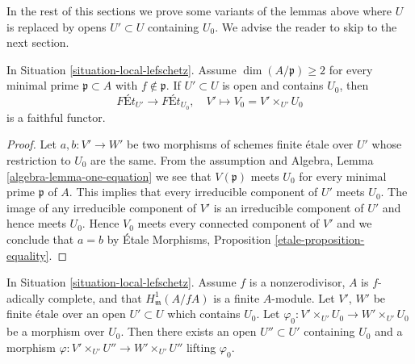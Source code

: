 \noindent
In the rest of this sections we prove some variants of the lemmas above
where $U$ is replaced by opens $U' \subset U$ containing $U_0$.
We advise the reader to skip to the next section.

\begin{lemma}
\label{lemma-faithful-general}
In Situation \ref{situation-local-lefschetz}.
Assume $\dim(A/\mathfrak p) \geq 2$ for every minimal prime
$\mathfrak p \subset A$ with $f \not \in \mathfrak p$.
If $U' \subset U$ is open and contains $U_0$, then
$$
\textit{F\'Et}_{U'} \longrightarrow \textit{F\'Et}_{U_0},\quad
V' \longmapsto V_0 = V' \times_{U'} U_0
$$
is a faithful functor.
\end{lemma}

\begin{proof}
Let $a, b : V' \to W'$ be two morphisms of schemes finite \'etale
over $U'$ whose restriction to $U_0$ are the same. From the assumption
and Algebra, Lemma \ref{algebra-lemma-one-equation}
we see that $V(\mathfrak p)$ meets $U_0$ for
every minimal prime $\mathfrak p$ of $A$. This implies that every
irreducible component of $U'$ meets $U_0$.
The image of any irreducible component of $V'$ is an
irreducible component of $U'$ and hence meets $U_0$.
Hence $V_0$ meets every connected component of $V'$ and
we conclude that $a = b$ by \'Etale Morphisms, Proposition
\ref{etale-proposition-equality}.
\end{proof}

\begin{lemma}
\label{lemma-fully-faithful-general}
In Situation \ref{situation-local-lefschetz}.
Assume $f$ is a nonzerodivisor, $A$ is $f$-adically complete, and that
$H^1_\mathfrak m(A/fA)$ is a finite $A$-module.
Let $V'$, $W'$ be finite \'etale over an open $U' \subset U$
which contains $U_0$. Let
$\varphi_0 : V' \times_{U'} U_0 \to W' \times_{U'} U_0$
be a morphism over $U_0$.
Then there exists an open $U'' \subset U'$
containing $U_0$ and a morphism
$\varphi : V' \times_{U'} U'' \to W' \times_{U'} U''$
lifting $\varphi_0$.
\end{lemma}

